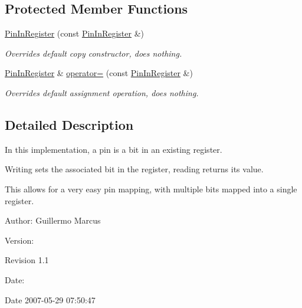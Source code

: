 \subsection*{Protected Member Functions}
\begin{CompactItemize}
\item 
\hyperlink{classmprace_1_1PinInRegister_b0}{Pin\-In\-Register} (const \hyperlink{classmprace_1_1PinInRegister}{Pin\-In\-Register} \&)
\begin{CompactList}\small\item\em Overrides default copy constructor, does nothing. \item\end{CompactList}\item 
\hyperlink{classmprace_1_1PinInRegister}{Pin\-In\-Register} \& \hyperlink{classmprace_1_1PinInRegister_b1}{operator=} (const \hyperlink{classmprace_1_1PinInRegister}{Pin\-In\-Register} \&)
\begin{CompactList}\small\item\em Overrides default assignment operation, does nothing. \item\end{CompactList}\end{CompactItemize}


\subsection{Detailed Description}
In this implementation, a pin is a bit in an existing register. 

Writing sets the associated bit in the register, reading returns its value.

This allows for a very easy pin mapping, with multiple bits mapped into a single register.

\begin{Desc}
\item[Author:]Guillermo Marcus \end{Desc}
\begin{Desc}
\item[Version:]\begin{Desc}
\item[Revision]1.1 \end{Desc}
\end{Desc}
\begin{Desc}
\item[Date:]\begin{Desc}
\item[Date]2007-05-29 07:50:47 \end{Desc}
\end{Desc}




